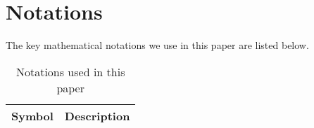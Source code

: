 \section{\textbf{Notations}}
The key mathematical notations we use in this paper are listed below.
\begin{table}
    \centering
    \caption{Notations used in this paper}
    \begin{tabular}{c|c}
        \hline 
        \textbf{Symbol} & \textbf{Description} \\ \hline 
    \end{tabular}
\end{table}